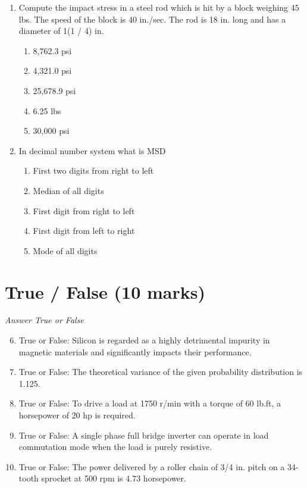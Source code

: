 \documentclass[12pt]{article}
\begin{document}
\begin{enumerate}[label=\arabic*.]
\begin{enumerate}[label=(\alph*)]
\end{enumerate}
\item Compute the impact stress in a steel rod which is hit by a block weighing 45 lbs. The
speed of the block is 40 in./sec. The rod is 18 in. long and has a diameter of 1(1 / 4)
in.
\begin{enumerate}[label=(\alph*)]
    \item 8,762.3 psi
    \item 4,321.0 psi
    \item 25,678.9 psi
    \item 6.25 lbs
    \item 30,000 psi
\end{enumerate}
\item In decimal number system what is MSD
\begin{enumerate}[label=(\alph*)]
    \item First two digits from right to left
    \item Median of all digits
    \item First digit from right to left
    \item First digit from left to right
    \item Mode of all digits
\end{enumerate}
\end{enumerate}

\section*{True / False (10 marks)}
\textit{Answer True or False}
\begin{enumerate}[label=\arabic*.]
\setcounter{enumi}{5}
\item True or False: Silicon is regarded as a highly detrimental impurity in magnetic materials and significantly impacts their performance.
\item True or False: The theoretical variance of the given probability distribution is 1.125.
\item True or False: To drive a load at 1750 r/min with a torque of 60 lb.ft, a horsepower of 20 hp is required.
\item True or False: A single phase full bridge inverter can operate in load commutation mode when the load is purely resistive.
\item True or False: The power delivered by a roller chain of 3/4 in. pitch on a 34-tooth sprocket at 500 rpm is 4.73 horsepower.
\end{enumerate}
\end{document}
